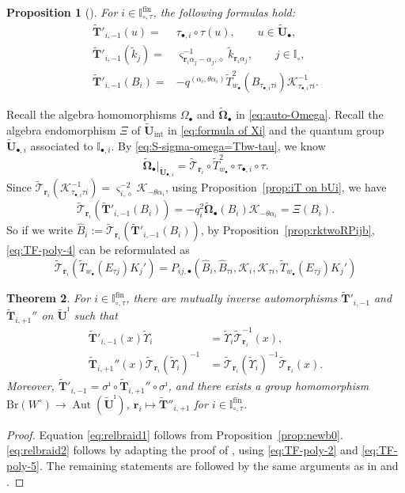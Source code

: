 \documentclass[a4paper,reqno,12pt]{amsart}
\numberwithin{equation}{section}
\newtheorem{proposition}{Proposition}[section]
\newtheorem{theorem}[proposition]{Theorem}
\theoremstyle{definition}
\theoremstyle{plain}
\theoremstyle{definition}
\def\I{\mathbb I}
\def\wI{\I_\circ}
\def\bw{w_\bullet}
\def\br{\mathbf r}
\def\tU{\widetilde{\mathbf U}}
\def\tUi{\widetilde{\mathbf U}^{\imath}}
\def \tbU{\tU_{\bullet}}
\def \tbiU{\tU_{\bullet,i}}
\def\tTD{\widetilde T}
\def\tT{\widetilde{\mathscr T}}
\def\tTT{\widetilde{\mathbf T}}
\def\tk{\widetilde k}
\def\cK{\mathcal K}
\def\vs{\varsigma}
\def\dm{\diamond}
\def \wItau{\I_{\circ,\tau}}
\def \fwItau{\wItau^{\mathrm{fin}}}
\def \Ob{\Omega_\bullet}
\def \wObb{\widetilde{\mathbf{\Omega}}_\bullet}
\newcommand{\Aut}{\operatorname{Aut}\nolimits}
\begin{document}
\begin{proposition}[{\cite[Proposition 4.1,Theorem 4.14]{WZ23}\label{prop:iT on bUi}}]
For $i\in\fwItau$, the following formulas hold:
\begin{align*}
    \tTT'_{i,-1}(u)=&\tau_{\bullet,i}\circ\tau(u),\qquad u\in\tbU,\\
    \tTT'_{i,-1}(\tk_j)=&\vs_{\br_i\alpha_j-\alpha_j,\dm}^{-1}\tk_{\br_i\alpha_j},\qquad j\in\wI,\\
    \tTT'_{i,-1}(B_i)=&-q^{(\alpha_i,\theta\alpha_i)}\tTD_{\bw}^2(B_{\tau_{\bullet,i}\tau i})\cK^{-1}_{\tau_{\bullet,i}\tau i}.
\end{align*}
\end{proposition}
Recall the algebra homomorphisms $\Ob$ and $\wObb$ in \eqref{eq:auto-Omega}. Recall the algebra endomorphism $\Xi$ of $\tU_{\text{int}}$ in \eqref{eq:formula of Xi} and the quantum group $\tbiU$ associated to $ \I_{\bullet,i}$. By \eqref{eq:S-sigma-omega=Tbw-tau}, we know 
\begin{equation}\label{eq:local formula of wObb}
    \wObb|_{\tbiU}=\tT_{\br_i}\circ\tTD_{\bw}^2\circ\tau_{\bullet,i}\circ\tau.
\end{equation}
Since $\tT_{\br_i}(\cK^{-1}_{\tau_{\bullet,i}\tau i})=\vs_{i,\dm}^{-2}\cK_{-\theta\alpha_i}$, using Proposition~\ref{prop:iT on bUi}, we have
\begin{equation*}
 \tT_{\br_i}(\tTT'_{i,-1}(B_i))=-q_i^2 \wObb(B_i)\cK_{-\theta\alpha_i}=\Xi(B_i).   
\end{equation*}
So if we write $\widehat{B}_i:=\tT_{\br_i}(\tTT'_{i,-1}(B_i))$, by Proposition~\ref{prop:rktwoRPijb}, \eqref{eq:TF-poly-4} can be reformulated as 
\begin{equation}\label{eq:TF-poly-5}
 \tT_{\br_i} (\tTD_{\bw}( E_{\tau j}) K_j') = P_{ij,\bullet}(\widehat{B}_i, \widehat{B}_{\tau i}, \cK_i, \cK_{\tau i}, \tTD_{\bw}( E_{\tau j}) K_j')   
\end{equation}

    \begin{theorem}
		\label{thm: relative T_i conjugate}
		For $i\in\fwItau$, there are mutually inverse automorphisms $\tTT'_{i,-1}$ and $\tTT_{i,+1}''$ on $\tUi$ such that
		\begin{align}
			\label{eq:relbraid1}
			\tTT'_{i,-1}(x)\widetilde{\Upsilon}_i &=\widetilde{\Upsilon}_i\tT_{\br_i}^{-1}(x),
			\\
			\label{eq:relbraid2}
			\tTT_{i,+1}''(x)\tT_{\br_i}(\widetilde{\Upsilon}_i)^{-1} &=\tT_{\br_i}(\widetilde{\Upsilon}_i)^{-1}\tT_{\br_i}(x).
		\end{align}
		Moreover, $\tTT'_{i,-1}=\sigma^\imath\circ \tTT_{i,+1}''\circ \sigma^\imath$, and there exists a group homomorphism $\mathrm{Br}(W^\circ)\rightarrow \Aut(\tUi)$, $\br_i\mapsto \tTT''_{i,+1}$ for $i\in\fwItau$.
	\end{theorem}
\begin{proof}
Equation \eqref{eq:relbraid1} follows from Proposition~\ref{prop:newb0}.  \eqref{eq:relbraid2} follows by adapting the  proof of \cite[Theorem 6.1]{WZ23}, using \eqref{eq:TF-poly-2} and \eqref{eq:TF-poly-5}. The remaining statements are followed by the same arguments as in \cite[\S6.5, \S9.1]{WZ23} and \cite[\S3.4]{Z23}.
\end{proof}
\end{document}
